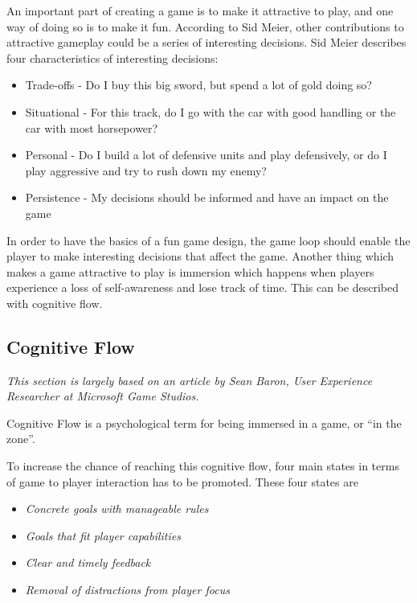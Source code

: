 An important part of creating a game is to make it attractive to play, and one way of doing so is to make it fun.
According to Sid Meier\cite{GDC2012}, other contributions to attractive gameplay could be a series of interesting decisions.
Sid Meier describes four characteristics of interesting decisions\cite{GDC2012}:
\begin{itemize}
	\item Trade-offs - Do I buy this big sword, but spend a lot of gold doing so?
	\item Situational - For this track, do I go with the car with good handling or the car with most horsepower?
	\item Personal - Do I build a lot of defensive units and play defensively, or do I play aggressive and try to rush down my enemy?
	\item Persistence - My decisions should be informed and have an impact on the game
\end{itemize}

In order to have the basics of a fun game design, the game loop should enable the player to make interesting decisions that affect the game.
Another thing which makes a game attractive to play is immersion which happens when players experience a loss of self-awareness and lose track of time.
This can be described with cognitive flow.

\subsection{Cognitive Flow}\label{makingthegamefun:cognitiveflow}
\emph{This section is largely based on an article by Sean Baron, User Experience Researcher at Microsoft Game
Studios\cite{baron}.}

Cognitive Flow is a psychological term for being immersed in a game, or ``in the zone''.

To increase the chance of reaching this cognitive flow, four main states in terms of game to player interaction has to
be promoted.  
These four states are 
\begin{itemize}
    \item \emph{Concrete goals with manageable rules}
    \item \emph{Goals that fit player capabilities}
    \item \emph{Clear and timely feedback}
    \item \emph{Removal of distractions from player focus}
\end{itemize}

